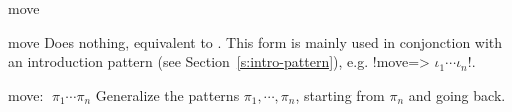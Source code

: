 \begin{tactic}{move}
  \begin{tsyntax}{move}
     Does nothing, equivalent to . This form is mainly
     used in conjonction with an introduction pattern (see
     Section~\ref{s:intro-pattern}), e.g. \ls!move=> $\iota_1 \cdots \iota_n$!.
  \end{tsyntax}

  \begin{tsyntax}{move: $\;\pi_1 \cdots \pi_n$}
    Generalize the patterns $\pi_1, \cdots, \pi_n$, starting from
    $\pi_n$ and going back.
  \end{tsyntax}
\end{tactic}
